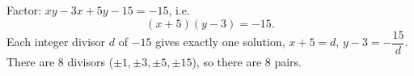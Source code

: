 Factor: $xy-3x+5y-15=-15$, i.e.
\[(x+5)(y-3)=-15.\]
Each integer divisor $d$ of $-15$ gives exactly one solution, $x+5=d$, $y-3=-\dfrac{15}{d}$. There are $8$ divisors ($\pm1,\pm3,\pm5,\pm15$), so there are $\boxed{8}$ pairs.
